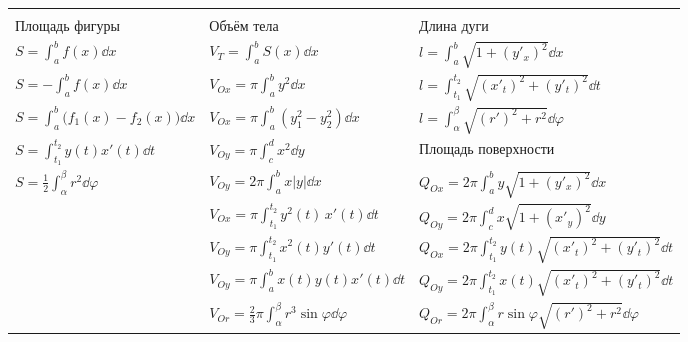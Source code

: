 \begin{table}[h]
    \centering
    \begin{tabular}{|l|l|l|}
        \hline
        & & \\[-8pt]
        Площадь фигуры & Объём тела & Длина дуги \\[1ex]
        $\displaystyle S = \int_{a}^{b} f(x)\dd{x}$ & $\displaystyle V_{T} = \int_{a}^{b} S(x)\dd{x}$ & $\displaystyle l = \int_{a}^{b} \sqrt{1 + (y'_x)^2} \dd{x}$ \\[2ex]
        $\displaystyle S = - \int_{a}^{b} f(x)\dd{x}$ & $\displaystyle V_{Ox} = \pi \int_{a}^{b} y^2 \dd{x}$ & $\displaystyle l = \int_{t_1}^{t_2} \sqrt{(x'_t)^2 + (y'_t)^2} \dd{t}$ \\[2ex]
        $\displaystyle S = \int_{a}^{b}\Big(f_1(x) - f_2(x)\Big)\dd{x}$ & $\displaystyle V_{Ox} = \pi \int_{a}^{b} \left(y_1^2 - y_2^2\right) \dd{x}$ & $\displaystyle l = \int_{\alpha}^{\beta} \sqrt{(r')^2 + r^2}\dd{\varphi}$ \\[2ex]
        \cline{3-3}
        $\displaystyle S = \int_{t_1}^{t_2} y(t) x'(t)\dd{t}$ & $\displaystyle V_{Oy} = \pi \int_{c}^{d} x^2 \dd{y}$ & Площадь поверхности \\[2ex]
        $\displaystyle S = \frac{1}{2} \int_{\alpha}^{\beta} r^2 \dd{\varphi}$ & $\displaystyle V_{Oy} = 2 \pi \int_{a}^{b} x|y|\dd{x}$ & $\displaystyle Q_{Ox} = 2\pi \int_{a}^{b} y \sqrt{1 + (y'_x)^2}\dd{x}$ \\[2ex]
        & $\displaystyle V_{Ox} = \pi \int_{t_1}^{t_2} y^2 (t)\, x'(t) \dd{t}$ & $\displaystyle Q_{Oy} = 2\pi \int_{c}^{d} x \sqrt{1 + (x'_y)^2}\dd{y}$ \\[2ex]
        & $\displaystyle V_{Oy} = \pi \int_{t_1}^{t_2} x^2(t) y'(t) \dd{t}$ & $\displaystyle Q_{Ox} = 2\pi \int_{t_1}^{t_2} y(t) \sqrt{(x'_t)^2 + (y'_t)^2}\dd{t}$\\[2ex]
        & $\displaystyle V_{Oy} = \pi \int_{a}^{b} x(t)y(t) x'(t) \dd{t}$ & $\displaystyle Q_{Oy} = 2\pi \int_{t_1}^{t_2} x(t) \sqrt{(x'_t)^2 + (y'_t)^2}\dd{t}$ \\[2ex]
        & $\displaystyle V_{Or} = \frac{2}{3} \pi \int_{\alpha}^{\beta} r^3 \sin \varphi \dd{\varphi}$ & $\displaystyle Q_{Or} = 2\pi \int_{\alpha}^{\beta} r\sin \varphi \sqrt{(r')^2 + r^2} \dd{\varphi}$ \\[2ex]
        \hline
    \end{tabular}
\end{table}

